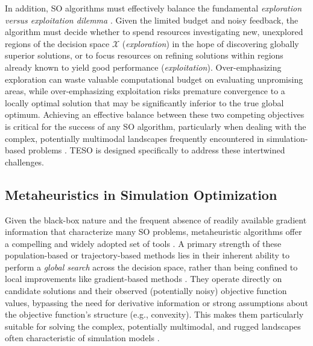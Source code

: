\documentclass{article}
\begin{document}
In addition, SO algorithms must effectively balance the fundamental \textit{exploration versus exploitation dilemma} \cite{amaran2016simulation}. Given the limited budget and noisy feedback, the algorithm must decide whether to spend resources investigating new, unexplored regions of the decision space $\mathcal{X}$ (\textit{exploration}) in the hope of discovering globally superior solutions, or to focus resources on refining solutions within regions already known to yield good performance (\textit{exploitation}). Over-emphasizing exploration can waste valuable computational budget on evaluating unpromising areas, while over-emphasizing exploitation risks premature convergence to a locally optimal solution that may be significantly inferior to the true global optimum. Achieving an effective balance between these two competing objectives is critical for the success of any SO algorithm, particularly when dealing with the complex, potentially multimodal landscapes frequently encountered in simulation-based problems \cite{nsiye2024micro,soykanWintersim2024}. TESO is designed specifically to address these intertwined challenges.


\subsection{Metaheuristics in Simulation Optimization}
\label{subsec:metaheuristics}

Given the black-box nature and the frequent absence of readily available gradient information that characterize many SO problems, metaheuristic algorithms offer a compelling and widely adopted set of tools \cite{amaran2016simulation}. A primary strength of these population-based or trajectory-based methods lies in their inherent ability to perform a \textit{global search} across the decision space, rather than being confined to local improvements like gradient-based methods \cite{Soykan2022}. They operate directly on candidate solutions and their observed (potentially noisy) objective function values, bypassing the need for derivative information or strong assumptions about the objective function's structure (e.g., convexity). This makes them particularly suitable for solving the complex, potentially multimodal, and rugged landscapes often characteristic of simulation models \cite{thengvall2025measuring}.
\end{document}
